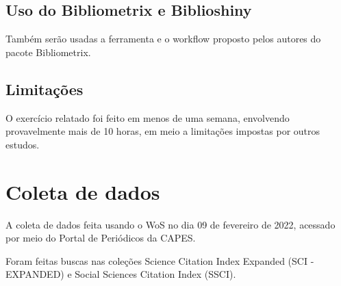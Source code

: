 \subsection{Uso do Bibliometrix e Biblioshiny}
Também serão usadas a ferramenta e o workflow proposto pelos autores do pacote Bibliometrix.

\subsection{Limitações} O exercício relatado foi feito em menos de uma semana, envolvendo  provavelmente mais de 10 horas, em meio a limitações impostas por outros estudos.
\newpage
\section{Coleta de dados}

A coleta de dados feita usando o WoS no dia 09 de fevereiro de 2022, acessado por meio do Portal de Periódicos da CAPES.

Foram feitas buscas nas coleções Science  Citation  Index  Expanded (SCI -EXPANDED) e Social  Sciences  Citation  Index (SSCI).

